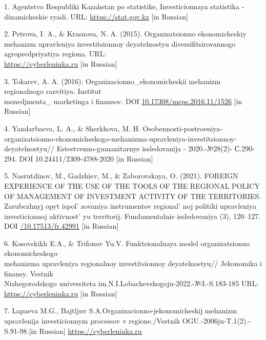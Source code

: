 \begin{references}
1. Agentstvo Respubliki Kazahstan po statistike, Investicionnaya
statistika - dinamicheskie ryadi. URL:
\href{https://stat.gov.kz/ru/industries/business-statistics/stat-invest/dynamic-tables/}{https://stat.gov.kz}
{[}in Russian{]}

2. Petrova, I. A., \& Krasnova, N. A. (2015). Organizatsionno
ekonomicheskiy mehanizm upravleniya investitsionnoy deyatelnostyu
diversifitsirovannogo agropredpriyatiya regiona. URL:\\
\href{https://cyberleninka.ru/article/n/organizatsionno-ekonomicheskiy-mehanizm-upravleniya-investitsionnoy-deyatelnostyu-diversifitsirovannogo-agropredpriyatiya-regiona}{https://cyberleninka.ru}
{[}in Russian{]}

3. Tokarev, A. A. (2016). Organizacionno\_ekonomicheskii mehanizm
regionalnogo razvitiya. Institut \\menedjmenta\_ marketinga i finansov.
DOI \href{https://doi.org/10.17308/meps.2016.11/1526}{10.17308/meps.2016.11/1526}
{[}in Russian{]}

4. Yandarbaeva, L. A., \& Sherkhova, M. H.
Osobennosti-postroeniya-organizatsionno-ekonomicheskogo-mehanizma-upravleniya-investitsionnoy-deyatelnostyu//
Estestvenno-gumanitarnye issledovanija - 2020.-№28(2)- С.290-294. DOI
10.24411/2309-4788-2020 {[}in Russian{]}

5. Nasrutdinov, M., Gadzhiev, M., \& Zaborovskaya, O. (2021). FOREIGN
EXPERIENCE OF THE USE OF THE TOOLS OF THE REGIONAL POLICY OF
MANAGEMENT OF INVESTMENT ACTIVITY OF THE TERRITORIES. Zarubezhnyj opyt
ispol' zovaniya instrumentov
regional' noj politiki upravleniya investicionnoj
aktivnost' yu territorij. Fundamentalnie issledovaniya
(3), 120--127. DOI
\href{https://doi.org/10.17513/fr.42991}{/10.17513/fr.42991} {[}in
Russian{]}

6. Kosovskikh E.A., \& Trifonov Yu.V. Funktsionalnaya model
organizatsionno ekonomicheskogo \\mehanizma upravleniya regionalnoy
investitsionnoy deyatelnostyu// Jekonomika i finansy. Vestnik\\
Nizhegorodskogo universiteta
im.N.I.Lobachevskogoju-2022.-№3.-S.183-185 URL:\\
\href{https://cyberleninka.ru/article/n/funktsionalnaya-model-organizatsionno-ekonomicheskogo-mehanizma-upravleniya-regionalnoy-investitsionnoy-deyatelnostyu}{https://cyberleninka.ru}
{[}in Russian{]}

7. Lapaeva M.G., Bajtljuv S.A.Organizacionno-jekonomicheskij mehanizm
upravlenija investicionnym processov v regione./Vestnik
OGU.-2006ju-T.1(2).-S.91-98.{[}in Russian{]}
\href{https://cyberleninka.ru/article/n/organizatsionno-ekonomicheskiy-mehanizm-upravleniya-investitsionnym-protsessom-v-regione}{https://cyberleninka.ru}


\end{references}
